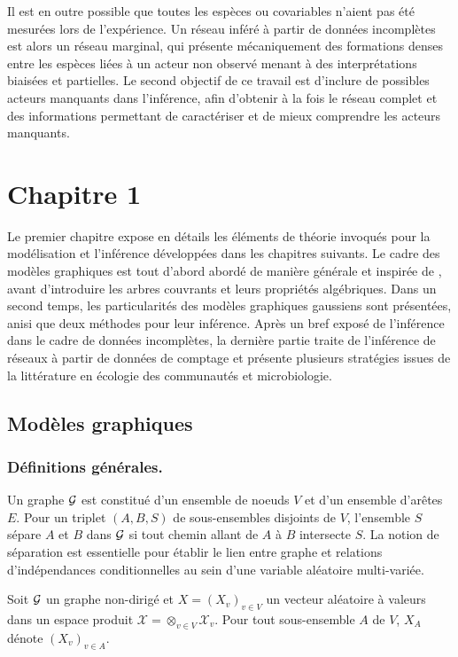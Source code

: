 Il est en outre possible que toutes les espèces ou covariables n'aient pas été mesurées lors de l'expérience. Un réseau inféré à partir de données incomplètes est alors un réseau marginal, qui présente mécaniquement des formations denses entre les espèces liées à un acteur non observé menant à des interprétations biaisées et partielles. Le second objectif de ce travail est  d'inclure de possibles acteurs manquants dans l'inférence, afin d'obtenir à la fois le réseau complet et des informations permettant de caractériser et de mieux comprendre les acteurs manquants. 


\section*{Chapitre 1}
Le premier chapitre  expose en détails les éléments de théorie invoqués pour la modélisation et l'inférence développées dans les chapitres suivants. Le cadre des modèles graphiques est tout d'abord abordé de manière générale et inspirée de \citet{Lau96}, avant d'introduire les arbres couvrants et leurs propriétés algébriques. Dans un second temps, les particularités des modèles graphiques gaussiens sont présentées, anisi que deux méthodes pour leur inférence. Après un bref exposé de l'inférence dans le cadre de données incomplètes, la dernière partie traite de l'inférence de réseaux à partir de données de comptage et présente plusieurs stratégies issues de la littérature en écologie des communautés et microbiologie.

\subsection*{Modèles graphiques}
\subsubsection*{Définitions générales.}
Un graphe $\mathcal{G}$ est constitué d'un ensemble de noeuds $V$ et d'un ensemble d'arêtes $E$. Pour un triplet $(A, B, S)$ de sous-ensembles disjoints de $V$, l'ensemble $S$ sépare $A$ et $B$ dans $\mathcal{G}$ si tout chemin allant de $A$ à $B$ intersecte $S$. La notion de séparation est essentielle  pour établir le lien entre graphe et relations d'indépendances conditionnelles au sein d'une variable aléatoire multi-variée. 

Soit $\mathcal{G}$ un graphe non-dirigé et $X=(X_v)_{v\in V}$ un vecteur aléatoire à valeurs dans un espace produit $\mathcal{X}=\otimes_{v\in V} \mathcal{X}_v$. Pour tout sous-ensemble $A$ de $V$, $X_A$ dénote $(X_v)_{v\in A}$.


